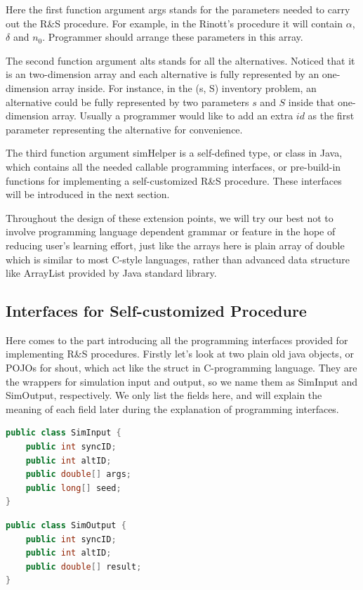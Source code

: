 \documentclass[12pt,a4paper]{report}
\begin{document}
Here the first function argument args stands for the parameters needed to carry out the R\&S procedure. For example, in the Rinott's procedure it will contain $\alpha$, $\delta$ and $n_0$. Programmer should arrange these parameters in this array.

The second function argument alts stands for all the alternatives. Noticed that it is an two-dimension array and each alternative is fully represented by an one-dimension array inside. For instance, in the (s, S) inventory problem, an alternative could be fully represented by two parameters $s$ and $S$ inside that one-dimension array. Usually a programmer would like to add an extra $id$ as the first parameter representing the alternative for convenience.

The third function argument simHelper is a self-defined type, or class in Java, which contains all the needed callable programming interfaces, or pre-build-in functions for implementing a self-customized R\&S procedure. These interfaces will be introduced in the next section.

Throughout the design of these extension points, we will try our best not to involve programming language dependent grammar or feature in the hope of reducing user's learning effort, just like the arrays here is plain array of double which is similar to most C-style languages, rather than advanced data structure like ArrayList provided by Java standard library.

\subsection{Interfaces for Self-customized Procedure}

Here comes to the part introducing all the programming interfaces provided for implementing R\&S procedures. Firstly let's look at two plain old java objects, or POJOs for shout, which act like the struct in C-programming language. They are the wrappers for simulation input and output, so we name them as SimInput and SimOutput, respectively. We only list the fields here, and will explain the meaning of each field later during the explanation of programming interfaces.

\begin{lstlisting}[language=Java]
public class SimInput {
	public int syncID;
	public int altID;
	public double[] args;
	public long[] seed;
}
\end{lstlisting}

\begin{lstlisting}[language=Java]
public class SimOutput {
	public int syncID;
	public int altID;
	public double[] result;
}
\end{lstlisting}
\end{document}
